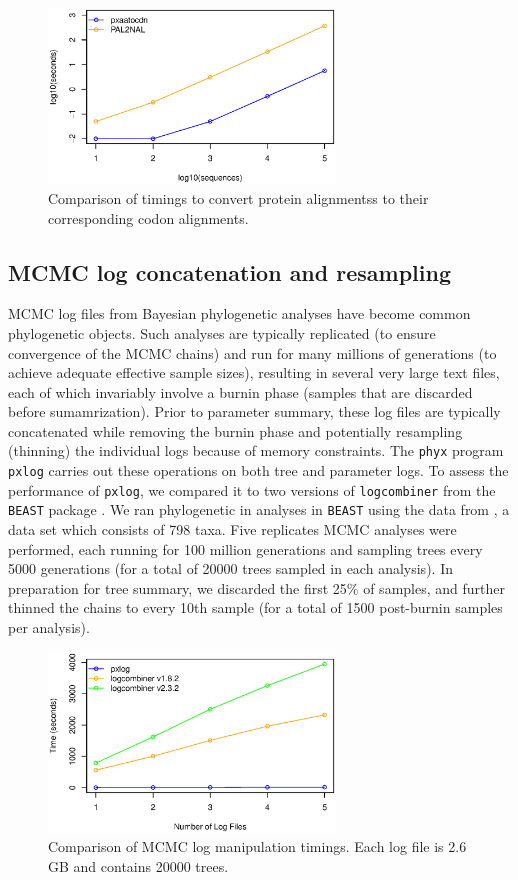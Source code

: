 \documentclass{article}
\begin{document}
\begin{figure}[h]
    \centering
    \includegraphics[width=3.0in]{aatocdn}
    \caption{Comparison of timings to convert protein alignmentss to
    their corresponding codon alignments.}
    \label{proteincodonfigure}
\label{fig:S2}
\end{figure}

\subsection{MCMC log concatenation and resampling}
MCMC log files from Bayesian phylogenetic analyses have become common phylogenetic objects. Such analyses are typically replicated (to ensure convergence of the MCMC chains) and run for many millions of generations (to achieve adequate effective sample sizes), resulting in several very large text files, each of which invariably involve a burnin phase (samples that are discarded before sumamrization). Prior to parameter summary, these log files are typically concatenated while removing the burnin phase and potentially resampling (thinning) the individual logs because of memory constraints. The \texttt{phyx} program \texttt{pxlog} carries out these operations on both tree and parameter logs. To assess the performance of \texttt{pxlog}, we compared it to two versions of \texttt{logcombiner} from the \texttt{BEAST} package \citep{DrummondRambaut2007,Bouckaert2014}. We ran phylogenetic in analyses in \texttt{BEAST} using the data from \cite{Magallon2015}, a data set which consists of 798 taxa. Five replicates MCMC analyses were performed, each running for 100 million generations and sampling trees every 5000 generations (for a total of 20000 trees sampled in each analysis). In preparation for tree summary, we discarded the first 25\% of samples, and further thinned the chains to every 10th sample (for a total of 1500 post-burnin samples per analysis).

\begin{figure}[!h]
    \centering
    \includegraphics[width=3.0in]{log}
    \caption{Comparison of MCMC log manipulation timings. Each log file
    is 2.6 GB and contains 20000 trees.}
    \label{logfigure}
\label{fig:S3}
\end{figure}
\end{document}
